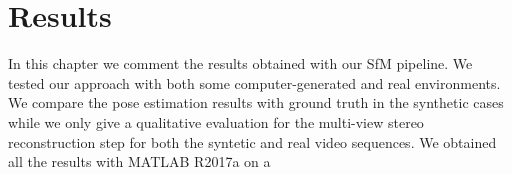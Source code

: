 \chapter{Results}
In this chapter we comment the results obtained with our SfM pipeline.
We tested our approach with both some computer-generated and real environments.
We compare the pose estimation results with ground truth in the synthetic cases
while we only give a qualitative evaluation for the multi-view stereo
reconstruction step for both the syntetic and real video sequences.
We obtained all the results with MATLAB R2017a on a 

